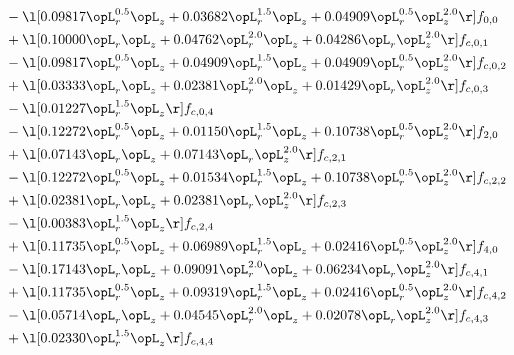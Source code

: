 \begin{alignat}{2}
& - \l[  0.09817 \opL_r^{0.5} \opL_z +  0.03682 \opL_r^{1.5} \opL_z +  0.04909 \opL_r^{0.5} \opL_z^{2.0}  \r] f_{0,0} \nonumber \\ 
& + \l[  0.10000 \opL_r \opL_z +  0.04762 \opL_r^{2.0} \opL_z +  0.04286 \opL_r \opL_z^{2.0}  \r] f_{c,0,1} \nonumber \\ 
& - \l[  0.09817 \opL_r^{0.5} \opL_z +  0.04909 \opL_r^{1.5} \opL_z +  0.04909 \opL_r^{0.5} \opL_z^{2.0}  \r] f_{c,0,2} \nonumber \\ 
& + \l[  0.03333 \opL_r \opL_z +  0.02381 \opL_r^{2.0} \opL_z +  0.01429 \opL_r \opL_z^{2.0}  \r] f_{c,0,3} \nonumber \\ 
& - \l[  0.01227 \opL_r^{1.5} \opL_z  \r] f_{c,0,4} \nonumber \\ 
& - \l[  0.12272 \opL_r^{0.5} \opL_z +  0.01150 \opL_r^{1.5} \opL_z +  0.10738 \opL_r^{0.5} \opL_z^{2.0}  \r] f_{2,0} \nonumber \\ 
& + \l[  0.07143 \opL_r \opL_z +  0.07143 \opL_r \opL_z^{2.0}  \r] f_{c,2,1} \nonumber \\ 
& - \l[  0.12272 \opL_r^{0.5} \opL_z +  0.01534 \opL_r^{1.5} \opL_z +  0.10738 \opL_r^{0.5} \opL_z^{2.0}  \r] f_{c,2,2} \nonumber \\ 
& + \l[  0.02381 \opL_r \opL_z +  0.02381 \opL_r \opL_z^{2.0}  \r] f_{c,2,3} \nonumber \\ 
& - \l[  0.00383 \opL_r^{1.5} \opL_z  \r] f_{c,2,4} \nonumber \\ 
& + \l[  0.11735 \opL_r^{0.5} \opL_z +  0.06989 \opL_r^{1.5} \opL_z +  0.02416 \opL_r^{0.5} \opL_z^{2.0}  \r] f_{4,0} \nonumber \\ 
& - \l[  0.17143 \opL_r \opL_z +  0.09091 \opL_r^{2.0} \opL_z +  0.06234 \opL_r \opL_z^{2.0}  \r] f_{c,4,1} \nonumber \\ 
& + \l[  0.11735 \opL_r^{0.5} \opL_z +  0.09319 \opL_r^{1.5} \opL_z +  0.02416 \opL_r^{0.5} \opL_z^{2.0}  \r] f_{c,4,2} \nonumber \\ 
& - \l[  0.05714 \opL_r \opL_z +  0.04545 \opL_r^{2.0} \opL_z +  0.02078 \opL_r \opL_z^{2.0}  \r] f_{c,4,3} \nonumber \\ 
& + \l[  0.02330 \opL_r^{1.5} \opL_z  \r] f_{c,4,4} \nonumber \\ 
\end{alignat} 



